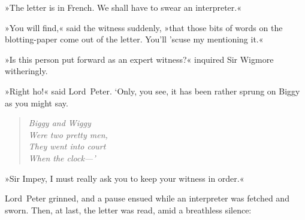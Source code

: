 »The letter is in French. We shall have to swear an interpreter.«

»You will find,« said the witness suddenly, »that those bits of words on the blotting-paper come out of the letter. You'll 'scuse my mentioning it.«

»Is this person put forward as an expert witness?« inquired Sir Wigmore witheringly.

»Right ho!« said Lord~Peter. `Only, you see, it has been rather sprung on Biggy as you might say.

\begin{quote}\itshape
Biggy and Wiggy\\
Were two pretty men,\\
They went into court\\
When the clock—'
\end{quote}

»Sir Impey, I must really ask you to keep your witness in order.«

Lord~Peter grinned, and a pause ensued while an interpreter was fetched and sworn. Then, at last, the letter was read, amid a breathless silence:

